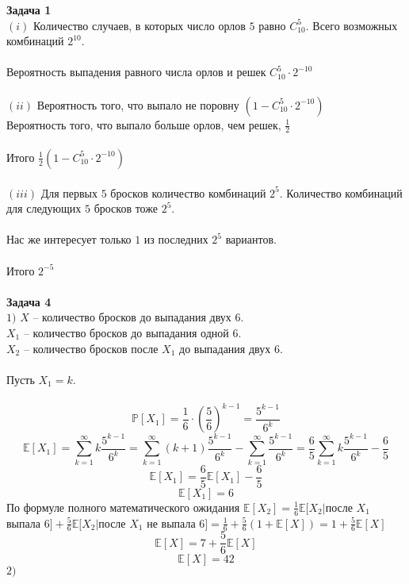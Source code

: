 \documentclass[11pt]{article}
\begin{document}
	\textbf{Задача 1}
	\\
	$(i)$ Количество случаев, в которых число орлов $5$ равно $C_{10}^{5}$. Всего возможных комбинаций $2^{10}$.
	\\
	\\
	Вероятность выпадения равного числа орлов и решек $C_{10}^{5} \cdot 2^{-10}$
	\\\\
	$(ii)$ Вероятность того, что выпало не поровну $(1-C_{10}^{5} \cdot 2^{-10})$\\
	Вероятность того, что выпало больше орлов, чем решек, $\frac{1}{2}$\\\\
	Итого $\frac{1}{2}(1-C_{10}^{5} \cdot 2^{-10})$
	\\
	\\
	$(iii)$ Для первых $5$ бросков количество комбинаций $2^5$. Количество комбинаций для следующих $5$ бросков тоже $2^5$.
	\\\\
	Нас же интересует только $1$ из последних $2^5$ вариантов.\\\\
	Итого $2^{-5}$
\\\\

	\textbf{Задача 4}
	\\
	$1)$ $X$ -- количество бросков до выпадания двух $6$. \\
	$X_1$ -- количество бросков до выпадания одной $6$. \\
	$X_2$ -- количество бросков после $X_1$ до выпадания двух $6$.
	\\\\
	Пусть $X_1 = k$.
	\\\\
	\[\mathbb{P}[X_1] = \frac{1}{6} \cdot (\frac{5}{6})^{k-1} = \frac{5^{k-1}}{6^k}\]
	\[\mathbb{E}[X_1] = \sum_{k=1}^{\infty} k\frac{5^{k-1}}{6^k} = \sum_{k=1}^{\infty} (k+1)\frac{5^{k-1}}{6^k} - \sum_{k=1}^{\infty} \frac{5^{k-1}}{6^k} = \frac{6}{5} \sum_{k=1}^{\infty} k\frac{5^{k-1}}{6^k} - \frac{6}{5}\]
	\[\mathbb{E}[X_1] = \frac{6}{5}\mathbb{E}[X_1] - \frac{6}{5}\]
	\[\mathbb{E}[X_1] = 6\]
	По формуле полного математического ожидания
	$\mathbb{E}[X_2] = \frac{1}{6} \mathbb{E}[X_2|$после $X_1$ выпала $6] + \frac{5}{6}\mathbb{E}[X_2|$после $X_1$ не выпала $6] = \frac{1}{6} + \frac{5}{6}(1+\mathbb{E}[X]) = 1 + \frac{5}{6} \mathbb{E}[X]$
	\[\mathbb{E}[X] = 7 + \frac{5}{6} \mathbb{E}[X]\]
	\[\mathbb{E}[X] = 42\]
	\newpage
	$2)$
	
\end{document}
